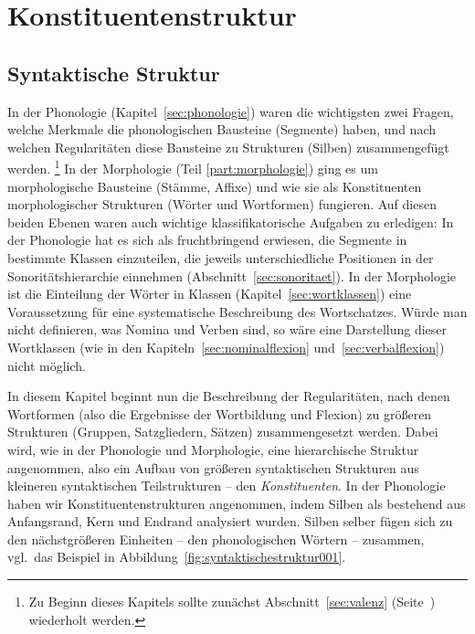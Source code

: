 \chapter{Konstituentenstruktur}
\label{sec:konstituentenstruktur}

\section{Syntaktische Struktur}
\label{sec:syntaktischestruktur}

In der Phonologie (Kapitel~\ref{sec:phonologie}) waren die wichtigsten zwei Fragen, welche Merkmale die phonologischen Bausteine (Segmente) haben, und nach welchen Regularitäten diese Bausteine zu Strukturen (\zB Silben) zusammengefügt werden.%
\footnote{Zu Beginn dieses Kapitels sollte zunächst Abschnitt~\ref{sec:valenz} (Seite~\pageref{sec:valenz}) wiederholt werden.}
In der Morphologie (Teil \ref{part:morphologie}) ging es um morphologische Bausteine (Stämme, Affixe) und wie sie als Konstituenten morphologischer Strukturen (Wörter und Wortformen) fungieren.
Auf diesen beiden Ebenen waren auch wichtige klassifikatorische Aufgaben zu erledigen:
In der Phonologie hat es sich \zB als fruchtbringend erwiesen, die Segmente in bestimmte Klassen einzuteilen, die jeweils unterschiedliche Positionen in der Sonoritätshierarchie einnehmen (Abschnitt~\ref{sec:sonoritaet}).
In der Morphologie ist die Einteilung der Wörter in Klassen (Kapitel~\ref{sec:wortklassen}) eine Voraussetzung für eine systematische Beschreibung des Wortschatzes.
Würde man nicht definieren, was \zB Nomina und Verben sind, so wäre eine Darstellung dieser Wortklassen (wie in den Kapiteln~\ref{sec:nominalflexion} und~\ref{sec:verbalflexion}) nicht möglich.

In diesem Kapitel beginnt nun die Beschreibung der Regularitäten, nach denen Wortformen (also die Ergebnisse der Wortbildung und Flexion) zu größeren Strukturen (Gruppen, Satzgliedern, Sätzen) zusammengesetzt werden.
Dabei wird, wie in der Phonologie und Morphologie, eine hierarchische Struktur angenommen, also ein Aufbau von größeren syntaktischen Strukturen aus kleineren syntaktischen Teilstrukturen -- den \textit{Konstituenten}.
In der Phonologie haben wir Konstituentenstrukturen angenommen, indem \zB Silben als bestehend aus Anfangsrand, Kern und Endrand analysiert wurden.
Silben selber fügen sich zu den nächstgrößeren Einheiten -- den phonologischen Wörtern -- zusammen, vgl.\ das Beispiel in Abbildung~\ref{fig:syntaktischestruktur001}.

